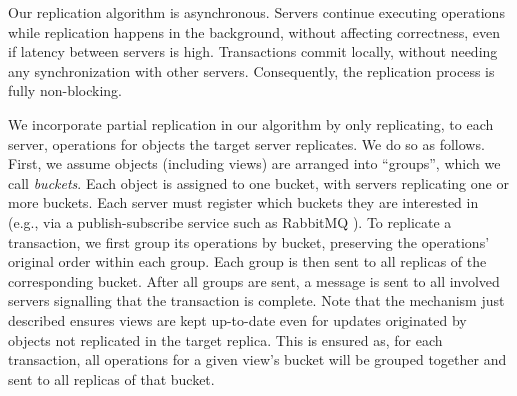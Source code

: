 Our replication algorithm is asynchronous.
Servers continue executing operations while replication happens in the background, without affecting correctness, even if latency between servers is high.
Transactions commit locally, without needing any synchronization with other servers.
Consequently, the replication process is fully non-blocking.

We incorporate partial replication in our algorithm by only replicating, to each server, operations for objects the target server replicates.
We do so as follows.
First, we assume objects (including views) are arranged into ``groups'', which we call \emph{buckets}.
Each object is assigned to one bucket, with servers replicating one or more buckets.
Each server must register which buckets they are interested in (e.g., via a publish-subscribe service such as RabbitMQ \cite{rabbitmq}).
To replicate a transaction, we first group its operations by bucket, preserving the operations' original order within each group.
Each group is then sent to all replicas of the corresponding bucket.
After all groups are sent, a message is sent to all involved servers signalling that the transaction is complete.
Note that the mechanism just described ensures views are kept up-to-date even for updates originated by objects not replicated in the target replica.
This is ensured as, for each transaction, all operations for a given view's bucket will be grouped together and sent to all replicas of that bucket.


